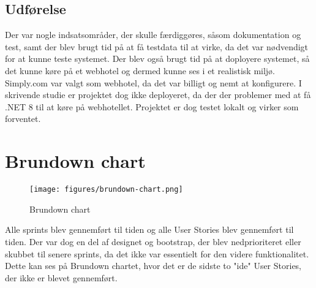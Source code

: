 \subsection{Udførelse}
\label{subsec:sprint-6-udforelse}
Der var nogle indsatsområder, der skulle færdiggøres, såsom dokumentation og test, samt der blev brugt tid på at få testdata til at virke, da det var nødvendigt for at kunne teste systemet.
Der blev også brugt tid på at doployere systemet, så det kunne køre på et webhotel og dermed kunne ses i et realistisk miljø. Simply.com var valgt som webhotel, da det var billigt og nemt at konfigurere.
I skrivende studie er projektet dog ikke deployeret, da der der problemer med at få .NET 8 til at køre på webhotellet. Projektet er dog testet lokalt og virker som forventet.

\section{Brundown chart}
\label{sec:brundown-chart}

\begin{figure}[H]
    \centering
    \texttt{[image: figures/brundown-chart.png]}
    \caption{Brundown chart}
    \label{fig:brundown-chart}
\end{figure}

Alle sprints blev gennemført til tiden og alle User Stories blev gennemført til tiden. Der var dog en del af designet og bootstrap, der blev nedprioriteret eller skubbet til senere sprints, 
da det ikke var essentielt for den videre funktionalitet. Dette kan ses på Brundown chartet, hvor det er de sidste to "ide" User Stories, der ikke er blevet gennemført.